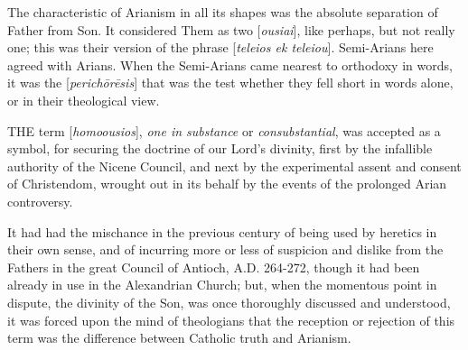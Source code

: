 The characteristic of Arianism in all its shapes
was the absolute separation of Father from Son. It considered
Them as two [\emph{ousiai}], like perhaps, but not really one; this
was their version of the phrase [\emph{teleios ek teleiou}].
Semi-Arians here agreed with Arians. When the Semi-Arians came nearest
to orthodoxy in words, it was the [\emph{perich\={o}r\={e}sis}]
that was the test whether they fell short in words alone, or in their
theological view.

\xsection{[Homoousios]}

THE
term [\emph{homoousios}], \emph{one in substance} or \emph{consubstantial},
was accepted as a symbol, for securing the doctrine of our Lord's
divinity, first by the infallible authority of the Nicene Council, and
next by the experimental assent and consent of Christendom, wrought
out in its behalf by the events of the prolonged Arian controversy.

It had had the mischance in the previous century
of being used by heretics in their own sense, and of incurring more or
less of suspicion and dislike from the Fathers in the great Council of
Antioch, A.D.
264-272, though it had been already in use in the Alexandrian Church;
but, when the momentous point in dispute, the divinity of the Son, was
once thoroughly discussed and understood, it was forced upon the mind
of theologians that the reception or rejection of this term was the
difference between Catholic truth and Arianism.

